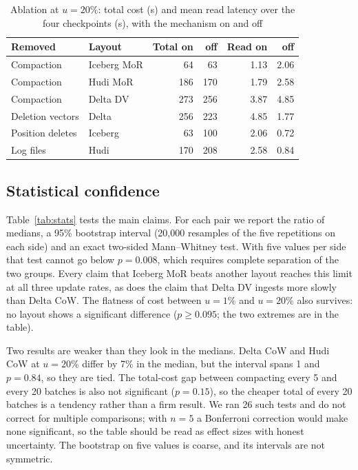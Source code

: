 \documentclass[conference]{IEEEtran}
\begin{document}
\begin{table}[!t]\centering
\caption{Ablation at $u=20\%$: total cost (s) and mean read latency over the four checkpoints (s), with the mechanism on and off}\label{tab:ablation}
\footnotesize\setlength{\tabcolsep}{3pt}
\begin{tabular}{@{}llrrrr@{}}\toprule
Removed & Layout & Total on & off & Read on & off\\\midrule
Compaction & Iceberg MoR & 64 & 63 & 1.13 & 2.06\\
Compaction & Hudi MoR & 186 & 170 & 1.79 & 2.58\\
Compaction & Delta DV & 273 & 256 & 3.87 & 4.85\\
Deletion vectors & Delta & 256 & 223 & 4.85 & 1.77\\
Position deletes & Iceberg & 63 & 100 & 2.06 & 0.72\\
Log files & Hudi & 170 & 208 & 2.58 & 0.84\\\bottomrule
\end{tabular}
\end{table}

\subsection{Statistical confidence}\label{sec:stats}
Table~\ref{tab:stats} tests the main claims. For each pair we report the ratio of medians, a 95\% bootstrap interval (20,000 resamples
of the five repetitions on each side) and an exact two-sided Mann--Whitney test. With five values per side that test cannot go below
$p=0.008$, which requires complete separation of the two groups. Every claim that Iceberg MoR beats another layout reaches this
limit at all three update rates, as does the claim that Delta DV ingests more slowly than Delta CoW. The flatness of cost between
$u=1\%$ and $u=20\%$ also survives: no layout shows a significant difference ($p\ge 0.095$; the two extremes are in the table).

Two results are weaker than they look in the medians. Delta CoW and Hudi CoW at $u=20\%$ differ by 7\% in the median, but the
interval spans 1 and $p=0.84$, so they are tied. The total-cost gap between compacting every 5 and every 20 batches is also not
significant ($p=0.15$), so the cheaper total of every 20 batches is a tendency rather than a firm result. We ran 26 such tests and
do not correct for multiple comparisons; with $n=5$ a Bonferroni correction would make none significant, so the table should be read as
effect sizes with honest uncertainty. The bootstrap on five values is coarse, and its intervals are not symmetric.
\end{document}
